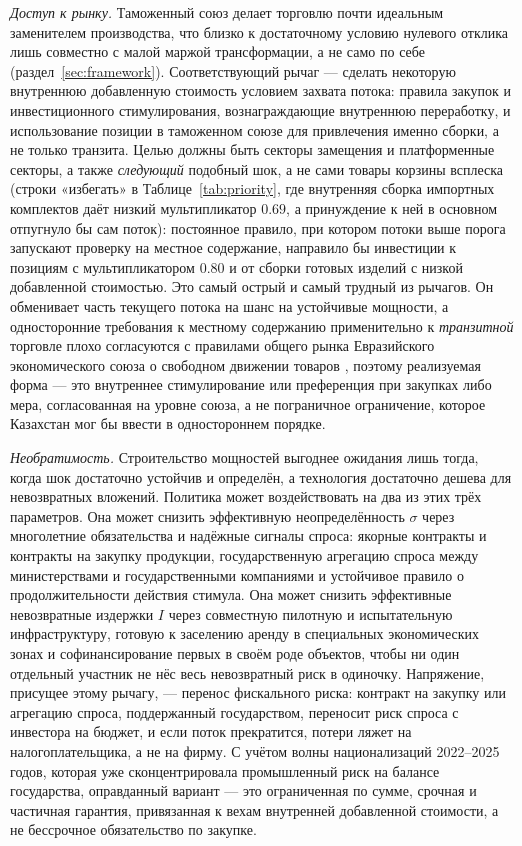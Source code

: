 \documentclass[12pt]{article}
\begin{document}
\emph{Доступ к рынку.} Таможенный союз делает торговлю почти идеальным заменителем
производства, что близко к достаточному условию нулевого отклика лишь совместно с малой
маржой трансформации, а не само по себе (раздел~\ref{sec:framework}). Соответствующий рычаг
— сделать некоторую внутреннюю добавленную стоимость условием захвата потока: правила
закупок и инвестиционного стимулирования, вознаграждающие внутреннюю переработку, и
использование позиции в таможенном союзе для привлечения именно сборки, а не только
транзита. Целью должны быть секторы замещения и платформенные секторы, а также \emph{следующий}
подобный шок, а не сами товары корзины всплеска (строки «избегать» в
Таблице~\ref{tab:priority}, где внутренняя сборка импортных комплектов даёт низкий
мультипликатор $0.69$, а принуждение к ней в основном отпугнуло бы сам поток): постоянное
правило, при котором потоки выше порога запускают проверку на местное содержание, направило
бы инвестиции к позициям с мультипликатором $0.80$ и от сборки готовых изделий с низкой
добавленной стоимостью. Это самый острый и самый трудный из рычагов. Он обменивает часть
текущего потока на шанс на устойчивые мощности, а односторонние требования к местному
содержанию применительно к \emph{транзитной} торговле плохо согласуются с правилами общего
рынка Евразийского экономического союза о свободном движении товаров
\citep{eaeu2014treaty}, поэтому реализуемая форма — это внутреннее стимулирование или
преференция при закупках либо мера, согласованная на уровне союза, а не пограничное
ограничение, которое Казахстан мог бы ввести в одностороннем порядке.

\emph{Необратимость.} Строительство мощностей выгоднее ожидания лишь тогда, когда шок
достаточно устойчив и определён, а технология достаточно дешева для невозвратных вложений.
Политика может воздействовать на два из этих трёх параметров. Она может снизить эффективную
неопределённость $\sigma$ через многолетние обязательства и надёжные сигналы спроса:
якорные контракты и контракты на закупку продукции, государственную агрегацию спроса между
министерствами и государственными компаниями и устойчивое правило о продолжительности
действия стимула. Она может снизить эффективные невозвратные издержки $I$ через совместную
пилотную и испытательную инфраструктуру, готовую к заселению аренду в специальных
экономических зонах и софинансирование первых в своём роде объектов, чтобы ни один
отдельный участник не нёс весь невозвратный риск в одиночку. Напряжение, присущее этому
рычагу, — перенос фискального риска: контракт на закупку или агрегацию спроса,
поддержанный государством, переносит риск спроса с инвестора на бюджет, и если поток
прекратится, потери ляжет на налогоплательщика, а не на фирму. С учётом волны
национализаций 2022--2025 годов, которая уже сконцентрировала промышленный риск на балансе
государства, оправданный вариант — это ограниченная по сумме, срочная и частичная гарантия,
привязанная к вехам внутренней добавленной стоимости, а не бессрочное обязательство по
закупке.
\end{document}

